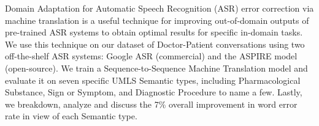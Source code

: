 Domain Adaptation for Automatic Speech Recognition (ASR) error correction via machine translation is a useful technique for improving out-of-domain outputs of pre-trained ASR systems to obtain optimal results for specific in-domain tasks. We use this technique on our dataset of Doctor-Patient conversations using two off-the-shelf ASR systems: Google ASR (commercial) and the ASPIRE model (open-source). We train a Sequence-to-Sequence Machine Translation model and evaluate it on seven specific UMLS Semantic types, including Pharmacological Substance, Sign or Symptom, and Diagnostic Procedure to name a few. Lastly, we breakdown, analyze and discuss the 7\% overall improvement in word error rate in view of each Semantic type.
